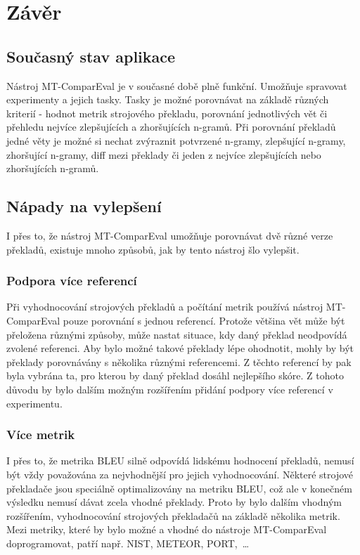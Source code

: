 \chapter{Závěr}

\section{Současný stav aplikace}
Nástroj MT-ComparEval je v současné době plně funkční.
Umožňuje spravovat experimenty a jejich tasky.
Tasky je možné porovnávat na základě různých kriterií -
  hodnot metrik strojového překladu,
  porovnání jednotlivých vět
  či přehledu nejvíce zlepšujících a zhoršujících n-gramů.
Při porovnání překladů jedné věty je možné si nechat zvýraznit
  potvrzené n-gramy, zlepšující n-gramy, zhoršující n-gramy, diff mezi překlady
  či jeden z nejvíce zlepšujících nebo zhoršujících n-gramů.


\section{Nápady na vylepšení}
I přes to, že nástroj MT-ComparEval umožňuje porovnávat dvě různé verze překladů,
  existuje mnoho způsobů,
  jak by tento nástroj šlo vylepšit.

\subsection{Podpora více referencí}
Při vyhodnocování strojových překladů a počítání metrik používá nástroj MT-ComparEval pouze porovnání s jednou referencí.
Protože většina vět může být přeložena různými způsoby,
  může nastat situace,
  kdy daný překlad neodpovídá zvolené referenci.
Aby bylo možné takové překlady lépe ohodnotit,
  mohly by být překlady porovnávány s několika různými referencemi.
Z těchto referencí by pak byla vybrána ta,
  pro kterou by daný překlad dosáhl nejlepšího skóre.
Z tohoto důvodu by bylo dalším možným rozšířením přidání podpory více referencí v experimentu.

\subsection{Více metrik}
I přes to, že metrika BLEU silně odpovídá lidskému hodnocení překladů,
  nemusí být vždy považována za nejvhodnější pro jejich vyhodnocování.
Některé strojové překladače jsou speciálně optimalizovány na metriku BLEU,
  což ale v konečném výsledku nemusí dávat zcela vhodné překlady.
Proto by bylo dalším vhodným rozšířením,
  vyhodnocování strojových překladačů na základě několika metrik.
Mezi metriky,
  které by bylo možné a vhodné do nástroje MT-ComparEval doprogramovat,
  patří např. NIST, METEOR, PORT,~\dots

